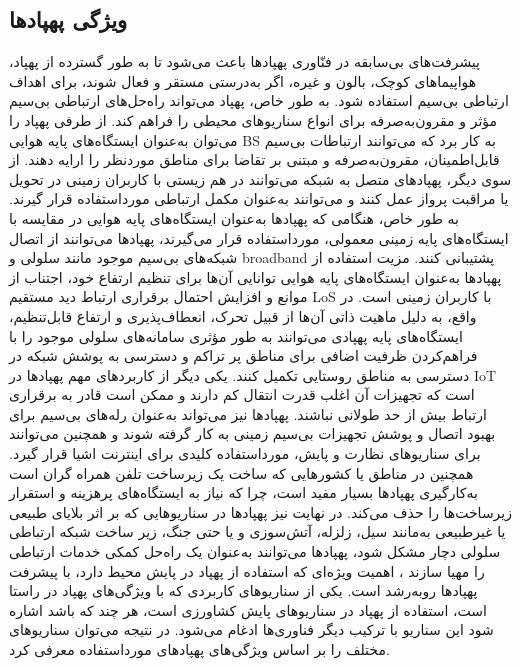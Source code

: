 \subsection{ویژگی پهپادها}
پیشرفت‌های بی‌سابقه در فنّاوری پهپادها باعث می‌شود تا به طور گسترده از پهپاد، هواپیماهای کوچک، بالون و غیره، اگر به‌درستی مستقر و فعال شوند، برای اهداف ارتباطی بی‌سیم استفاده شود\cite{bucaille2013rapidly}. به طور خاص، پهپاد می‌تواند راه‌حل‌های ارتباطی بی‌سیم مؤثر و مقرون‌به‌صرفه برای انواع سناریوهای محیطی را فراهم کند. از طرفی پهپاد را می‌توان به‌عنوان ایستگاه‌های پایه هوایی \gls{BS} به کار برد که می‌توانند ارتباطات بی‌سیم قابل‌اطمینان، مقرون‌به‌صرفه و مبتنی بر تقاضا برای مناطق موردنظر را ارایه دهند. از سوی دیگر، پهپادهای متصل به شبکه می‌توانند در هم زیستی با کاربران زمینی در تحویل یا مراقبت پرواز عمل کنند و می‌توانند به‌عنوان مکمل ارتباطی مورداستفاده قرار گیرند.
به طور خاص، هنگامی که پهپادها به‌عنوان ایستگاه‌های پایه هوایی در مقایسه با ایستگاه‌های پایه زمینی معمولی، مورداستفاده قرار می‌گیرند، پهپادها می‌توانند از اتصال شبکه‌های بی‌سیم موجود مانند سلولی و \gls{broadband} پشتیبانی کنند. مزیت استفاده از پهپادها به‌عنوان ایستگاه‌های پایه هوایی توانایی آن‌ها برای تنظیم ارتفاع خود، اجتناب از موانع و افزایش احتمال برقراری ارتباط دید مستقیم \gls{LoS} با کاربران زمینی است. در واقع، به دلیل ماهیت ذاتی آن‌ها از قبیل تحرک، انعطاف‌پذیری و ارتفاع قابل‌تنظیم، ایستگاه‌های پایه پهپادی می‌توانند به طور مؤثری سامانه‌های سلولی موجود را با فراهم‌کردن ظرفیت اضافی برای مناطق پر تراکم و دسترسی به پوشش شبکه در دسترسی به مناطق روستایی تکمیل کنند. یکی دیگر از کاربردهای مهم پهپادها در \gls{IoT} است که تجهیزات آن اغلب قدرت انتقال کم دارند و ممکن است قادر به برقراری ارتباط بیش از حد طولانی نباشند. پهپادها نیز می‌تواند به‌عنوان رله‌های بی‌سیم برای بهبود اتصال و پوشش تجهیزات بی‌سیم زمینی به کار گرفته شوند و همچنین می‌توانند برای سناریوهای نظارت و پایش، مورداستفاده کلیدی برای اینترنت اشیا قرار گیرد. همچنین در مناطق یا کشورهایی که ساخت یک زیرساخت تلفن همراه گران است به‌کارگیری پهپادها بسیار مفید است، چرا که نیاز به ایستگاه‌های پرهزینه و استقرار زیرساخت‌ها را حذف می‌کند. در نهایت نیز پهپادها در سناریوهایی که بر اثر بلایای طبیعی یا غیرطبیعی به‌مانند سیل، زلزله، آتش‌سوزی و یا حتی جنگ، زیر ساخت شبکه ارتباطی سلولی دچار مشکل شود، پهپادها می‌توانند به‌عنوان یک راه‌حل کمکی خدمات ارتباطی را مهیا سازند
\cite{DelCerro2021,agriculture13071375,agriengineering5010022,s20030817}،
اهمیت ویژه‌ای که استفاده از پهپاد در پایش محیط دارد، با پیشرفت پهپادها روبه‌رشد است. یکی از سناریوهای کاربردی که با ویژگی‌های پهپاد در راستا است، استفاده از پهپاد در سناریوهای پایش کشاورزی است، هر چند که باشد اشاره شود این سناریو با ترکیب دیگر فناوری‌ها ادغام می‌شود. در نتیجه می‌توان سناریوهای مختلف را بر اساس ویژگی‌های پهپادهای مورداستفاده معرفی کرد.

